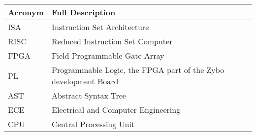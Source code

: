 \begin{table}[H]
	\begin{tabularx}{\textwidth}{| a | x |}
		\hline
		\textbf{Acronym} & \textbf{Full Description}                                       \\
		\hline
		ISA              & Instruction Set Architecture                                    \\
		RISC             & Reduced Instruction Set Computer                                \\
		FPGA             & Field Programmable Gate Array                                   \\
		PL               & Programmable Logic, the FPGA part of the Zybo development Board \\
		AST              & Abstract Syntax Tree                                            \\
		ECE              & Electrical and Computer Engineering                             \\
		CPU              & Central Processing Unit                                         \\
		\hline
	\end{tabularx}
\end{table}

